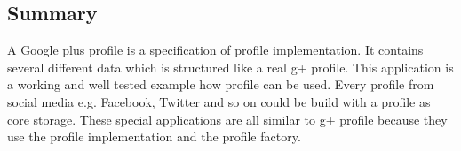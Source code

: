 \documentclass[12pt]{article}
\begin{document}
\subsection{Summary}

A Google plus profile is a specification of profile implementation. It contains several different data which is structured like a real g+ profile. This application is a working and well tested example how profile can be used. Every profile from social media e.g. Facebook, Twitter and so on could be build with a profile as core storage. These special applications are all similar to g+ profile because they use the profile implementation and the profile factory.
\end{document}
